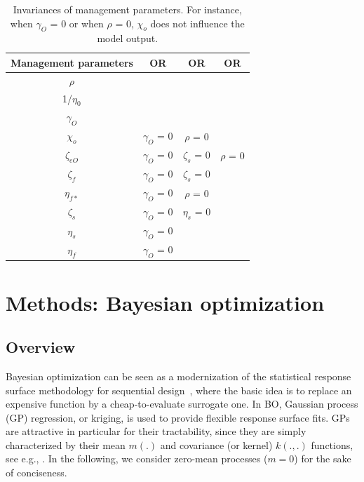 	\begin{table}[htbp]
		\centering
		\caption{Invariances of management parameters. For instance, when  $\gamma_{O}$ = 0 or when $\rho$ = 0, $\chi_{o}$ does not influence the model output. }
		\begin{tabular}{|c|c|c|c|}
			\midrule
			\textbf{Management parameters} & \textbf{OR} & \textbf{OR} & \textbf{OR} \\
			\midrule
			$\rho$ & & & \\
			\midrule
			1/$\eta_{0}$ & & & \\
			\midrule
			$\gamma_{O}$ & & & \\
			\midrule
			$\chi_{o}$ & $\gamma_{O}$ = 0 & $\rho$ = 0 & \\
			\midrule
			$\zeta_{eO}$ & $\gamma_{O}$ = 0 & $\zeta_{s}$ = 0 & $\rho$ = 0\\
			\midrule
			$\zeta_{f}$ & $\gamma_{O}$ = 0 & $\zeta_{s}$ = 0 & \\
			\midrule
			$\eta_{f*}$ & $\gamma_{O}$ = 0 & $\rho$ = 0 & \\
			\midrule
			$\zeta_{s}$ & $\gamma_{O}$ = 0 & $\eta_{s}$ = 0 & \\
			\midrule
			$\eta_{s}$ & $\gamma_{O}$ = 0 & & \\
			\midrule
			$\eta_{f}$ & $\gamma_{O}$ = 0 & & \\
			\midrule
			
		\end{tabular}%
		\label{tab:table_invariances_parameters}%
	\end{table}%


\section{Methods: Bayesian optimization}\label{sec:bo}

\subsection{Overview}
Bayesian optimization can be seen as a modernization of the statistical response surface
methodology for sequential design~\cite{box1987empirical}, where the basic idea is to replace an expensive function by a cheap-to-evaluate surrogate one.
In BO, Gaussian process (GP) regression, or kriging, is used to provide flexible response surface fits.
GPs are attractive in particular for their tractability, 
since they are simply characterized by their mean $m(.)$ and covariance (or kernel) $k(.,.)$ functions, see e.g., \citet{Rasmussen2006}. 
In the following, we consider zero-mean processes ($m = 0$) for the sake of conciseness.

